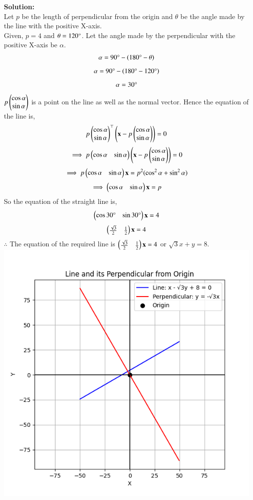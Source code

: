 \documentclass[journal]{IEEEtran}
\begin{document}
\textbf{Solution:}\\
Let $p$ be the length of perpendicular from the origin and $\theta$ be the angle made by the line with the positive X-axis.\\
Given, $p=4$ and $\theta=120\degree$.
Let the angle made by the perpendicular with the positive X-axis be $\alpha$.
\begin{align}
    \alpha=90\degree-(180\degree-\theta)
\end{align}
\begin{align}
    \alpha=90\degree-(180\degree-120\degree)
\end{align}
\begin{align}
    \alpha=30\degree
\end{align}
$p\begin{pmatrix} \cos\alpha \\ \sin\alpha \end{pmatrix}$
is a point on the line as well as the normal vector. Hence the equation of the line is,
\begin{align}
p\begin{pmatrix} \cos\alpha \\ \sin\alpha\end{pmatrix}^\top\left(\mathbf{x} - p  \begin{pmatrix} \cos\alpha \\ \sin\alpha\end{pmatrix}\right)   = 0
\end{align}
\begin{align}
\implies p\begin{pmatrix} \cos\alpha & \sin\alpha\end{pmatrix}\left(\mathbf{x} - p  \begin{pmatrix} \cos\alpha \\ \sin\alpha\end{pmatrix}\right)   = 0
\end{align}
\begin{align}
\implies  p\begin{pmatrix} \cos\alpha & \sin\alpha\end{pmatrix}\mathbf{x} = p^2(\cos^2\alpha+\sin^2\alpha) 
\end{align}
\begin{align}
\implies  \begin{pmatrix} \cos\alpha & \sin\alpha\end{pmatrix}\mathbf{x} = p 
\end{align}
So the equation of the straight line is,
\begin{align}
\begin{pmatrix} \cos30\degree & \sin30\degree\end{pmatrix}\mathbf{x} = 4 
\end{align}
\begin{align}
\begin{pmatrix} \frac{\sqrt{3}}{2} & \frac{1}{2}\end{pmatrix}\mathbf{x} = 4 
\end{align}
$\therefore$ The equation of the required line is $\begin{pmatrix} \frac{\sqrt{3}}{2} & \frac{1}{2}\end{pmatrix}\mathbf{x} = 4$ or ${\sqrt{3}}x + y=8$.
\centering   \includegraphics[width=\columnwidth, height=1\textheight, keepaspectratio]{figs/fig1.png}
\end{document}
